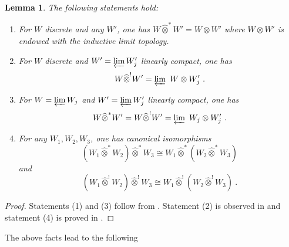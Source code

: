\documentclass[12pt,reqno]{amsart}
\newtheorem{lem}[thm]{Lemma}
\theoremstyle{definition}
\theoremstyle{remark}
\begin{document}
	\begin{lem} \label{lem:t1}
	The following statements hold:
	\begin{enumerate}
	    \item \label{one}
	    For $W$ discrete and any $W'$, one has 
	    $W\widehat{\otimes}^\ast W' = W\otimes W'$ where $W\otimes W'$ is endowed with the inductive limit topology.
	    
	    \item \label{two} For $W$ discrete and $W' = \varprojlim W'_j$ linearly compact, one has 
	    $$
	    W \widehat{\otimes}^! W' = \varprojlim  \ W\otimes W'_j \ .
	    $$
	    
	    \item \label{three}
	    For $W = \varprojlim W_j$ and $W' = \varprojlim W'_j$ linearly compact, one has 
	    $$W\widehat{\otimes}^\ast W' = W\widehat{\otimes}^! W' = \varprojlim \ W_j\otimes W'_j \ . $$
	    
	    \item \label{four}
	    For any $W_1 , W_2, W_3$, one has canonical isomorphisms  
	    $$(W_1 \widehat{\otimes}^\ast W_2) \widehat{\otimes}^\ast W_3 \cong W_1 \widehat{\otimes}^\ast (W_2 \widehat{\otimes}^\ast W_3)$$ 
	    and 
	    $$(W_1 \widehat{\otimes}^! W_2) \widehat{\otimes}^! W_3 \cong W_1 \widehat{\otimes}^! (W_2 \widehat{\otimes}^! W_3) \ . $$

	\end{enumerate}
	\end{lem}
	\begin{proof}
	    Statements (1) and (3) follow from \cite[Examples~13.1 (1), (2)]{Po}. Statement (2) is observed in \cite[Remark 12.1]{Po} and
	    statement (4) is proved in \cite[Proposition 13.4]{Po}.
	\end{proof}
	
	The above facts lead to the following
	
\end{document}
